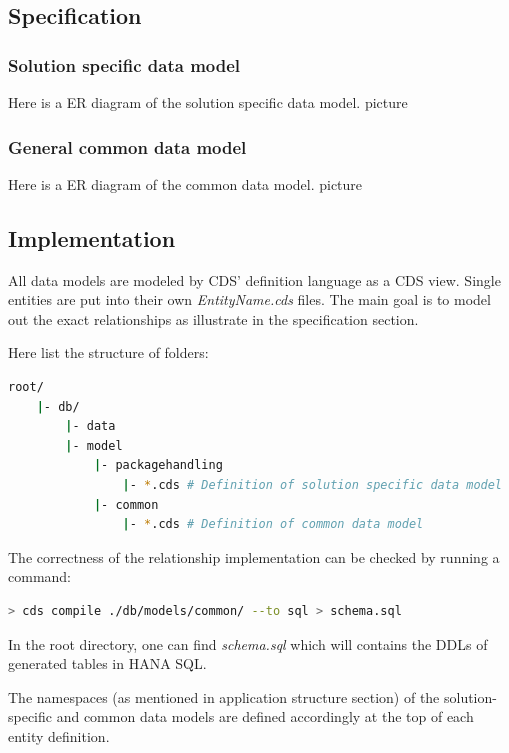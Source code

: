 \subsection{Specification}
\subsubsection{Solution specific data model}

Here is a ER diagram of the solution specific data model.
picture
\subsubsection{General common data model}

Here is a ER diagram of the common data model.
picture

\subsection{Implementation}
All data models are modeled by CDS' definition language as a CDS view. Single entities are put into their own \textit{EntityName.cds} files. The main goal is to model out the exact relationships as illustrate in the specification section.

Here list the structure of folders:
\begin{lstlisting}[language={bash}]
root/
    |- db/
        |- data
        |- model
            |- packagehandling 
                |- *.cds # Definition of solution specific data model
            |- common
                |- *.cds # Definition of common data model
\end{lstlisting}

The correctness of the relationship implementation can be checked by running a command:

\begin{lstlisting}[language={bash}]
> cds compile ./db/models/common/ --to sql > schema.sql
\end{lstlisting}

In the root directory, one can find \textit{schema.sql} which will contains the DDLs of generated tables in HANA SQL.

The namespaces (as mentioned in application structure section) of the solution-specific and common data models are defined accordingly at the top of each entity definition.

